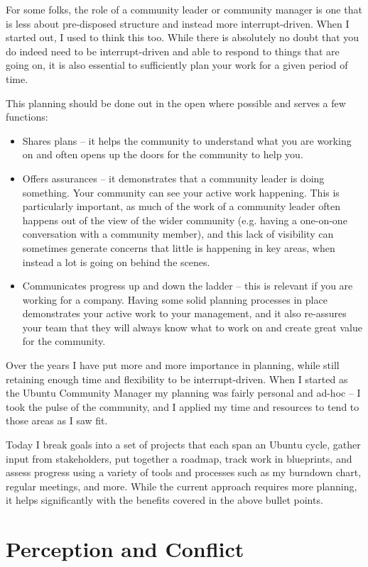 For some folks, the role of a community leader or community manager is one that
is less about pre-disposed structure and instead more interrupt-driven. When I
started out, I used to think this too. While there is absolutely no doubt that
you do indeed need to be interrupt-driven and able to respond to things that are
going on, it is also essential to sufficiently plan your work for a given period
of time.

This planning should be done out in the open where possible and serves a few
functions:
\begin{itemize}
 \item Shares plans -- it helps the community to understand what you are working
on and often opens up the doors for the community to help you.
 \item Offers assurances -- it demonstrates that a community leader is doing something.
Your community can see your active work happening. This is particularly
important, as much of the work of a community leader often happens out of the
view of the wider community (e.g. having a one-on-one conversation with a
community member), and this lack of visibility can sometimes generate concerns
that little is happening in key areas, when instead a lot is going on behind the
scenes.
 \item Communicates progress up and down the ladder -- this is relevant if you
are working for a company. Having some solid planning processes in place
demonstrates your active work to your management, and it also re-assures your
team that they will always know what to work on and create great value for the
community.
\end{itemize}
Over the years I have put more and more importance in planning, while still
retaining enough time and flexibility to be interrupt-driven. When I started as
the Ubuntu Community Manager my planning was fairly personal and ad-hoc -- I
took the pulse of the community, and I applied my time and resources to tend to
those areas as I saw fit.

Today I break goals into a set of projects that each span an Ubuntu cycle,
gather input from stakeholders, put together a roadmap, track work in
blueprints, and assess progress using a variety of tools and processes such as
my burndown chart, regular meetings, and more. While the current approach
requires more planning, it helps significantly with the benefits covered in the
above bullet points.

\section*{Perception and Conflict}

